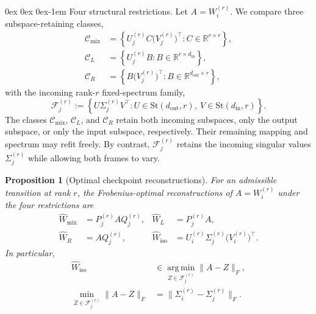 \documentclass[11pt, a4paper]{utda}
\makeatletter
\renewcommand{\paragraph}{%
  \@startsection{paragraph}{4}%
  {\z@}{0ex \@plus 0ex \@minus 0ex}{-1em}%
  {\normalfont\normalsize\bfseries}%
}
\theoremstyle{plain}
\newtheorem{proposition}[theorem]{Proposition}
\theoremstyle{definition}
\theoremstyle{remark}
\makeatother
\begin{document}
\paragraph{Four structural restrictions.}
Let $A=W_i^{(r)}$.
We compare three subspace-retaining classes,
\begin{equation}
\label{eq:app_reconstruction_classes}
\begin{aligned}
    \mathcal C_{\mathrm{mix}}
    &= \left\{
        U_j^{(r)}C\bigl(V_j^{(r)}\bigr)^\top:
        C\in\mathbb R^{r\times r}
    \right\},\\
    \mathcal C_L
    &= \left\{
        U_j^{(r)}B:
        B\in\mathbb R^{r\times d_{\mathrm{in}}}
    \right\},\\
    \mathcal C_R
    &= \left\{
        B\bigl(V_j^{(r)}\bigr)^\top:
        B\in\mathbb R^{d_{\mathrm{out}}\times r}
    \right\},
\end{aligned}
\end{equation}
with the incoming rank-$r$ fixed-spectrum family,
\begin{equation}
\label{eq:app-truncated_fixed_spectrum_family}
    \mathcal F_j^{(r)}
    := \left\{
        U\Sigma_j^{(r)}V^\top:
        U\in\mathrm{St}(d_{\mathrm{out}},r),\
        V\in\mathrm{St}(d_{\mathrm{in}},r)
    \right\}.
\end{equation}
The classes $\mathcal C_{\mathrm{mix}}$, $\mathcal C_L$, and
$\mathcal C_R$ retain both incoming subspaces, only the output
subspace, or only the input subspace, respectively.
Their remaining mapping and spectrum may refit freely.
By contrast, $\mathcal F_j^{(r)}$ retains the incoming singular
values $\Sigma_j^{(r)}$ while allowing both frames to vary.

\begin{proposition}[Optimal checkpoint reconstructions]
\label{prop:app_frame_adaptability}
For an admissible transition at rank $r$, the Frobenius-optimal
reconstructions of $A=W_i^{(r)}$ under the four restrictions are
\begin{equation}
\label{eq:app-transport_reconstructions}
\begin{aligned}
    \widehat W_{\mathrm{mix}}
    &= P_j^{(r)}AQ_j^{(r)},
    &\widehat W_L &= P_j^{(r)}A,\\
    \widehat W_R
    &= AQ_j^{(r)},
    &\widehat W_{\mathrm{iso}}
    &= U_i^{(r)}\Sigma_j^{(r)}\bigl(V_i^{(r)}\bigr)^\top.
\end{aligned}
\end{equation}
In particular,
\begin{equation}
\label{eq:app_iso_reconstruction_error}
\begin{aligned}
    \widehat W_{\mathrm{iso}}
    &\in \operatorname*{arg\,min}_{Z\in\mathcal F_j^{(r)}}
        \|A-Z\|_F,\\
    \min_{Z\in\mathcal F_j^{(r)}}\|A-Z\|_F
    &= \|\Sigma_i^{(r)}-\Sigma_j^{(r)}\|_F.
\end{aligned}
\end{equation}
\end{proposition}
\end{document}
